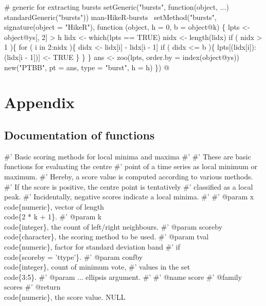 \documentclass[a4paper]{article}
\begin{document}
\nwenddocs{}\endmoddef
# generic for extracting bursts
setGeneric("bursts", function(object, ...) standardGeneric("bursts"))
\LA{}man-HikeR-bursts~{\nwtagstyle{}}\RA{}
setMethod("bursts",
    signature(object = "HikeR"),
    function (object, h = 0, b = object@k) \{
        lpts <- object@ys[, 2] > h
        lidx <- which(lpts == TRUE)
        nidx <- length(lidx)
        if ( nidx > 1 )\{
            for ( i in 2:nidx )\{
                didx <- lidx[i] - lidx[i - 1]
                if ( didx <= b )\{
                    lpts[(lidx[i]):(lidx[i - 1])] <- TRUE
                \}
            \}
        \}
        ans <- zoo(lpts, order.by = index(object@ys))
        new("PTBB", pt = ans, type = "burst", h = h)
\})
\nwendcode{}@

\section{Appendix}

\subsection{Documentation of functions}

\nwenddocs{}\endmoddef
#' Basic scoring methods for local minima and maxima
#'
#' These are basic functions for evaluating the centre
#' point of a time series as local minimum or maximum.
#' Hereby, a score value is computed according to various methods.
#' If the score is positive, the centre point is tentatively
#' classified as a local peak.
#' Incidentally, negative scores indicate a local minima.
#'
#' @param x \\code\{numeric\}, vector of length \\code\{2 * k + 1\}.
#' @param k \\code\{integer\}, the count of left/right neighbours.
#' @param scoreby \\code\{character\}, the scoring method to be used.
#' @param tval \\code\{numeric\}, factor for standard deviation band
#' if \\code\{scoreby = 'ttype'\}.
#' @param confby \\code\{integer\}, count of minimum vote,
#' values in the set \\code\{3:5\}.
#' @param ... ellipsis argument.
#'
#' @name score
#' @family scores
#' @return \\code\{numeric\}, the score value.
NULL
\end{document}
